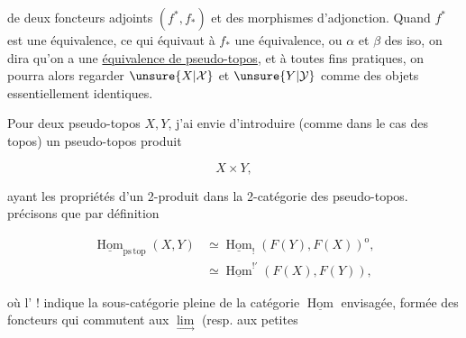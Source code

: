 
de deux foncteurs adjoints $(f^{*},f_{*})$ et des morphismes d'adjonction. Quand $f^{*}$ est une équivalence, ce qui équivaut à $f_{*}$ une équivalence, ou $\alpha$ et $\beta$ des iso, on dira qu'on a une \uline{équivalence de pseudo-topos}, et à toutes fins pratiques, on pourra alors regarder $\unsure{X|\mathcal X}$ et $\unsure{Y|\mathcal Y}$ comme des objets essentiellement identiques.

 Pour deux pseudo-topos $X,Y$, j'ai envie d'introduire (comme dans le cas des topos) un pseudo-topos produit

\[
X\times Y,
\tag*{(4.1.4)}
\]


ayant les propriétés d'un 2-produit dans la 2-catégorie des pseudo-topos.  précisons que par définition

\[
\begin{aligned}
\underline{\operatorname{Hom}}_{\mathrm{ps\,top}}(X,Y)
&\simeq\underline{\operatorname{Hom}}_{!}(F(Y),F(X))^{\mathrm{o}},\\
&\simeq\underline{\operatorname{Hom}}^{!'}(F(X),F(Y)),
\end{aligned}
\tag*{(4.1.5)}
\]

où l' !  indique la sous-catégorie pleine de la catégorie $\underline{\operatorname{Hom}}$ envisagée, formée des foncteurs qui commutent aux  $\underset{\longrightarrow}{\lim}$ (resp. aux petites
